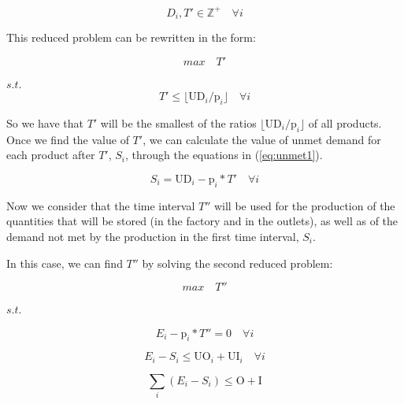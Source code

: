 \documentclass[authoryear,manuscript,12pt]{elsarticle}
\begin{document}
\begin{equation}
D_i, T' \in  \mathbb{Z}^+ \quad \forall i
\end{equation}

This reduced problem can be rewritten in the form:

\begin{equation}
max \quad T'
\end{equation}

$s.t.$ \\

\begin{equation}
T'  \leq \lfloor{\textrm{UD}_i / \textrm{p}_i}\rfloor \quad \forall i
\end{equation}

So we have that $T'$ will be the smallest of the ratios $\lfloor{\textrm{UD}_i / \textrm{p}_i}\rfloor$ of all products. \\

Once we find the value of $T'$, we can calculate the value of unmet demand for each product after $T'$, $S_i$, through the equations in (\ref{eq:unmet1}).

\begin{equation}
\label{eq:unmet1}
S_i = \textrm{UD}_i - \textrm{p}_i * T' \quad \forall i
\end{equation}

Now we consider that the time interval $T''$ will be used for the production of the quantities that will be stored (in the factory and in the outlets), as well as of the demand not met by the production in the first time interval, $S_i$. 

In this case, we can find $T''$ by solving the second reduced problem:

\begin{equation}
max \quad T''
\end{equation}

$s.t.$

\begin{equation}
E_i - \textrm{p}_i * T''  = 0 \quad \forall i
\end{equation}

\begin{equation}
E_i - S_i \leq \textrm{UO}_i + \textrm{UI}_i \quad \forall i
\end{equation}

\begin{equation}
\sum_i ({E_i - S_i}) \leq \textrm{O} + \textrm{I}
\end{equation}
\end{document}
